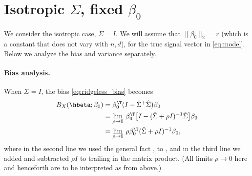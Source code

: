 \documentclass{article}
\begin{document}
\section{Isotropic $\Sigma$, fixed $\beta_0$}

We consider the isotropic case, $\Sigma = I$.  We will assume that $\|\beta_0\|_2
= r$ (which is a constant that does not vary with $n,d$), for the true signal
vector in \eqref{eq:model}. Below we analyze the bias and variance separately.

\paragraph{Bias analysis.}

When $\Sigma = I$, the bias \eqref{eq:ridgeless_bias} becomes 
\begin{align}
\nonumber
B_X(\hbeta; \beta_0) 
&= \beta_0^\T (I - \hSigma^+ \hSigma) \beta_0 \\ 
\nonumber
&= \lim_{\rho \to 0} \, \beta_0^\T \big[ I - (\hSigma + \rho I)^{-1} \hSigma  
  \big] \beta_0 \\   
\label{eq:ridgeless_bias_iso}
&= \lim_{\rho \to 0} \, \rho \beta_0^\T (\hSigma + \rho I)^{-1} \beta_0,  
\end{align}
where in the second line we used the general fact , to , and in the third line we added and subtracted $\rho I$ to
trailing \smash{$\hSigma$} in the matrix product. (All limits $\rho \to 0$ here  
and henceforth are to be interpreted as from above.) 
\end{document}

